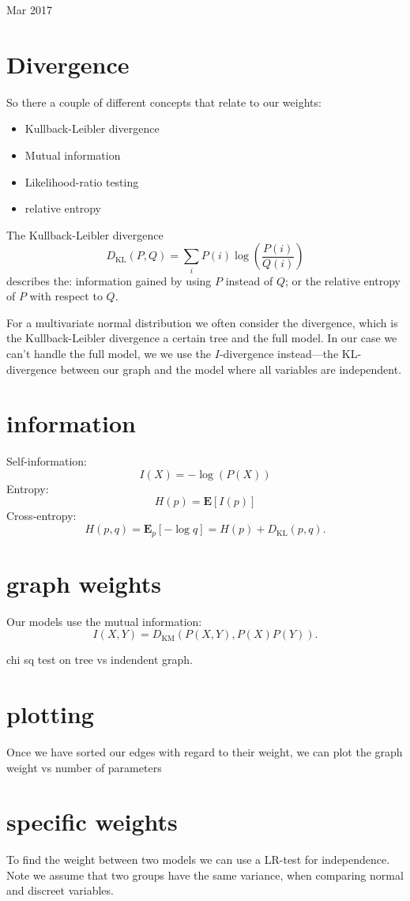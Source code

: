 \documentclass[12pt]{article}
\newcommand{\E}{\textbf{E}}
\begin{document}
{\Large Mar 2017}

\section{Divergence}
So there a couple of different concepts that relate to our weights:

\begin{itemize}
  \item Kullback-Leibler divergence
  \item Mutual information
  \item Likelihood-ratio testing
  \item relative entropy
\end{itemize}

The Kullback-Leibler divergence 
$$ D_\mathrm{KL}(P, Q) = \sum_i P(i) \log(\frac{P(i)}{Q(i)})$$
describes the: information gained by using $P$ instead of $Q$; or the relative entropy of $P$ with respect to $Q$.

For a multivariate normal distribution we often consider the divergence, which is the Kullback-Leibler divergence a certain tree and the full model. In our case we can't handle the full model, we we use the $I$-divergence instead---the KL-divergence between our graph and the model where all variables are independent.

\section{information}
Self-information:
$$ I(X) = - \log(P(X)) $$
Entropy:
$$ H(p) = \E[I(p)] $$
Cross-entropy:
$$ H(p,q) = \E_p[-\log q] = H(p) + D_\mathrm{KL}(p, q). $$
\section{graph weights}
Our models use the mutual information:
$$ I(X,Y) = D_\mathrm{KM}(P(X,Y), P(X)P(Y)). $$

chi sq test on tree vs indendent graph.

\section{plotting}
Once we have sorted our edges with regard to their weight, we can plot the
graph weight vs number of parameters

\section{specific weights}
To find the weight between two models we can use a LR-test for independence.
Note we assume that two groups have the same variance, when comparing normal
and discreet variables.
\end{document}
